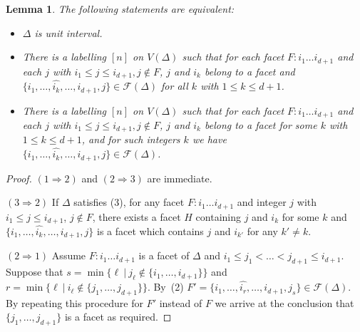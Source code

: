 \documentclass[12pt,reqno]{amsart}
\theoremstyle{plain}
\newtheorem{lemma}[theorem]{Lemma}
\theoremstyle{definition}
\numberwithin{equation}{section}
\begin{document}
\begin{lemma}\label{lem2.4}
The following statements are equivalent:
\begin{itemize}
  \item[(1)] $\Delta$ is unit interval.
  \item[(2)]  There is a labelling $[n]$ on $V(\Delta)$ such that for each facet $F: i_1\dots i_{d+1}$ and each $j$ with $i_1\leq j\leq i_{d+1}, j\notin F$, $j$ and $i_k$ belong to a facet and $\{i_1, \dots,  \widehat{i_k}, \dots, i_{d+1}, j\}\in \mathcal{F}(\Delta )$  for all $k$ with $1\leq k \leq d+1$. 
  \item[(3)] There is a labelling $[n]$ on $V(\Delta)$ such that for each facet $F: i_1\dots i_{d+1}$ and each $j$ with $i_1\leq j\leq i_{d+1}, j\notin F$, $j$ and $i_k$ belong to a facet for some $k$ with $1\leq k \leq d+1$, and for such integers $k$ we have  $\{i_1, \dots,  \widehat{i_k}, \dots, i_{d+1}, j\}\in \mathcal{F}(\Delta )$.
\end{itemize}
\end{lemma}
\begin{proof}
$(1\Longrightarrow 2)$  and $(2\Longrightarrow 3)$ are immediate.  

$(3 \Longrightarrow 2)$ If $\Delta$ satisfies (3), for any facet $F: i_1 \dots i_{d+1}$ and integer $j$ with $i_1 \leq j \leq i_{d+1}$, $j \notin F$, there exists a facet $H$ containing $j$ and $i_k$ for some $k$ and $\{i_1, \dots, \widehat{i_k}, \dots, i_{d+1}, j\}$ is a facet which contains $j$ and $i_{k'}$ for any $k' \neq k$. 

$(2\Longrightarrow 1)$ Assume $F: i_1\dots i_{d+1}$ is a facet of $\Delta$ and $ i_1\leq j_1< \dots <j_{d+1}\leq i_{d+1}$. Suppose that $s=\min \{\ell \ | \ j_\ell\notin \{i_1, \dots , i_{d+1}\}\}$ and $r=\min \{\ell \  | \ i_\ell \notin \{j_1, \dots , j_{d+1}\}\}$. By~(2) $F'=\{i_1, \dots , \widehat{i_r}, \dots , i_{d+1}, j_s\}\in \mathcal{F}(\Delta )$. By repeating this procedure for $F'$ instead of $F$ we arrive at the conclusion that $\{j_1, \dots , j_{d+1}\}$ is a facet as required.
\end{proof}
\end{document}
